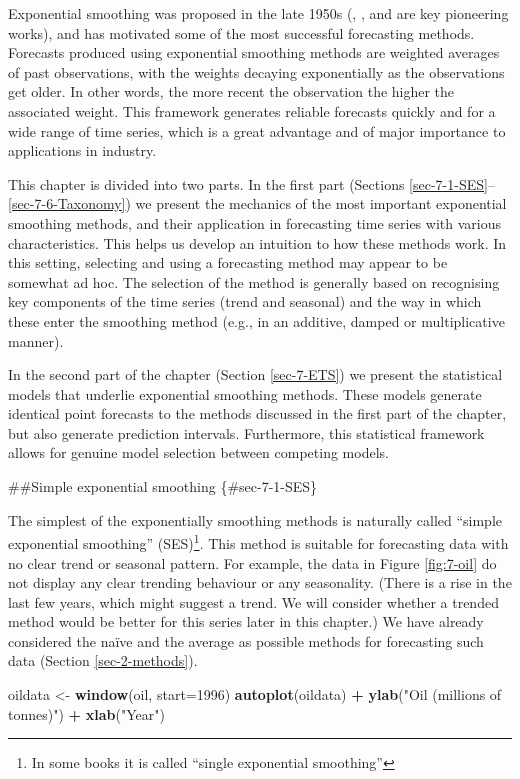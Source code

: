 \documentclass[]{book}
\newenvironment{Shaded}{\begin{snugshade}}{\end{snugshade}}
\newcommand{\DataTypeTok}[1]{\textcolor[rgb]{0.13,0.29,0.53}{#1}}
\newcommand{\DecValTok}[1]{\textcolor[rgb]{0.00,0.00,0.81}{#1}}
\newcommand{\KeywordTok}[1]{\textcolor[rgb]{0.13,0.29,0.53}{\textbf{#1}}}
\newcommand{\NormalTok}[1]{#1}
\newcommand{\OperatorTok}[1]{\textcolor[rgb]{0.81,0.36,0.00}{\textbf{#1}}}
\newcommand{\StringTok}[1]{\textcolor[rgb]{0.31,0.60,0.02}{#1}}
\let\rmarkdownfootnote\footnote%
\def\footnote{\protect\rmarkdownfootnote}
\begin{document}
Exponential smoothing was proposed in the late 1950s (\citet{Brown59}, \citet{Holt57}, and \citet{Winters60} are key pioneering works), and has motivated some of the most successful forecasting methods. Forecasts produced using exponential smoothing methods are weighted averages of past observations, with the weights decaying exponentially as the observations get older. In other words, the more recent the observation the higher the associated weight. This framework generates reliable forecasts quickly and for a wide range of time series, which is a great advantage and of major importance to applications in industry.

This chapter is divided into two parts. In the first part (Sections \ref{sec-7-1-SES}--\ref{sec-7-6-Taxonomy}) we present the mechanics of the most important exponential smoothing methods, and their application in forecasting time series with various characteristics. This helps us develop an intuition to how these methods work. In this setting, selecting and using a forecasting method may appear to be somewhat ad hoc. The selection of the method is generally based on recognising key components of the time series (trend and seasonal) and the way in which these enter the smoothing method (e.g., in an additive, damped or multiplicative manner).

In the second part of the chapter (Section \ref{sec-7-ETS}) we present the statistical models that underlie exponential smoothing methods. These models generate identical point forecasts to the methods discussed in the first part of the chapter, but also generate prediction intervals. Furthermore, this statistical framework allows for genuine model selection between competing models.

\#\#Simple exponential smoothing \{\#sec-7-1-SES\}

The simplest of the exponentially smoothing methods is naturally called ``simple exponential smoothing'' (SES)\footnote{In some books it is called ``single exponential smoothing''}. This method is suitable for forecasting data with no clear trend or seasonal pattern. For example, the data in Figure \ref{fig:7-oil} do not display any clear trending behaviour or any seasonality. (There is a rise in the last few years, which might suggest a trend. We will consider whether a trended method would be better for this series later in this chapter.) We have already considered the naïve and the average as possible methods for forecasting such data (Section \ref{sec-2-methods}).

\begin{Shaded}
\begin{Highlighting}[]
\NormalTok{oildata <-}\StringTok{ }\KeywordTok{window}\NormalTok{(oil, }\DataTypeTok{start=}\DecValTok{1996}\NormalTok{)}
\KeywordTok{autoplot}\NormalTok{(oildata) }\OperatorTok{+}
\StringTok{  }\KeywordTok{ylab}\NormalTok{(}\StringTok{"Oil (millions of tonnes)"}\NormalTok{) }\OperatorTok{+}\StringTok{ }\KeywordTok{xlab}\NormalTok{(}\StringTok{"Year"}\NormalTok{)}
\end{Highlighting}
\end{Shaded}
\end{document}
